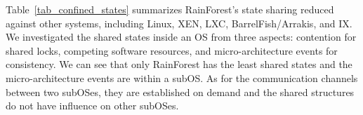 \documentclass[pageno]{jpaper}
\begin{document}
Table~\ref{tab_confined_states} summarizes RainForest's state sharing reduced against other systems, including Linux, XEN, LXC, BarrelFish/Arrakis, and IX. We investigated the shared states  inside an OS from three aspects: contention for shared locks, competing software resources, and micro-architecture events for consistency. We can see that only RainForest has the least shared states and the micro-architecture events are within a subOS. As for the communication channels between two subOSes, they are established on demand and the shared structures do not have influence on other subOSes.

















































































 
\end{document}
